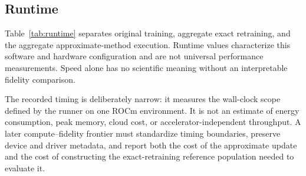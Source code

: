 \subsection{Runtime}
Table~\ref{tab:runtime} separates original training, aggregate exact retraining, and the
aggregate approximate-method execution. Runtime values characterize this software and
hardware configuration and are not universal performance measurements. Speed alone has no
scientific meaning without an interpretable fidelity comparison.

The recorded timing is deliberately narrow: it measures the wall-clock scope defined by the
runner on one ROCm environment. It is not an estimate of energy consumption, peak memory,
cloud cost, or accelerator-independent throughput. A later compute--fidelity frontier must
standardize timing boundaries, preserve device and driver metadata, and report both the
cost of the approximate update and the cost of constructing the exact-retraining reference
population needed to evaluate it.
\begin{table}[ht]
\centering
\caption{Recorded P001 runtime on the RX 7800 XT/ROCm environment.}
\label{tab:runtime}

\end{table}
